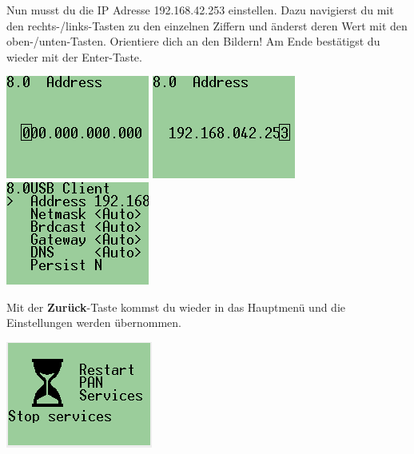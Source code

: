 \begin{enumerate}
			Nun musst du die IP Adresse 192.168.42.253 einstellen. Dazu navigierst du mit den rechts-/links-Tasten zu den einzelnen Ziffern und änderst deren Wert mit den oben-/unten-Tasten. Orientiere dich an den Bildern! Am Ende bestätigst du wieder mit der Enter-Taste. 
			
			\includegraphics[width=.3\textwidth]{img/ev3_pan_usb_setip1.png}
			\includegraphics[width=.3\textwidth]{img/ev3_pan_usb_setip2.png}
			\includegraphics[width=.3\textwidth]{img/ev3_pan_usb_isset.png}
			
			\begin{minipage}{.6\textwidth}
				\item Mit der \textbf{Zurück}-Taste kommst du wieder in das Hauptmenü und die Einstellungen werden übernommen.
			\end{minipage}
			\hfill
			\begin{minipage}{.3\textwidth}
				\includegraphics[width=\textwidth]{img/ev3_pan_usb_restart.png}
			\end{minipage}
		\end{enumerate}
		
